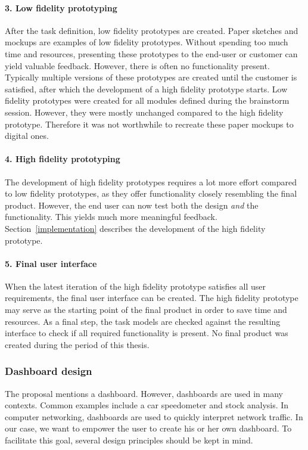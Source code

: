         \paragraph{3. Low fidelity prototyping} After the task definition, low fidelity prototypes are created. Paper sketches and mockups are examples of low fidelity prototypes. Without spending too much time and resources, presenting these prototypes to the end-user or customer can yield valuable feedback. However, there is often no functionality present. Typically multiple versions of these prototypes are created until the customer is satisfied, after which the development of a high fidelity prototype starts. Low fidelity prototypes were created for all modules defined during the brainstorm session. However, they were mostly unchanged compared to the high fidelity prototype. Therefore it was not worthwhile to recreate these paper mockups to digital ones.

        \paragraph{4. High fidelity prototyping} The development of high fidelity prototypes requires a lot more effort compared to low fidelity prototypes, as they offer functionality closely resembling the final product. However, the end user can now test both the design \emph{and} the functionality. This yields much more meaningful feedback. Section~\ref{implementation} describes the development of the high fidelity prototype.

        \paragraph{5. Final user interface} When the latest iteration of the high fidelity prototype satisfies all user requirements, the final user interface can be created. The high fidelity prototype may serve as the starting point of the final product in order to save time and resources. As a final step, the task models are checked against the resulting interface to check if all required functionality is present. No final product was created during the period of this thesis. 

        \subsubsection{Dashboard design}\label{dashboards}

        The proposal mentions a dashboard. However, dashboards are used in many contexts. Common examples include a car speedometer and stock analysis. In computer networking, dashboards are used to quickly interpret network traffic. In our case, we want to empower the user to create his or her own dashboard. To facilitate this goal, several design principles should be kept in mind.
        
